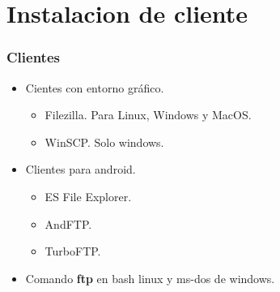 \section{Instalacion de cliente}
  \begin{frame}
    \frametitle{Clientes}
    \begin{itemize}
    	\item Cientes con entorno gr\'afico.
		\begin{itemize}
	   	 \item Filezilla. Para Linux, Windows y MacOS.
	   	 \item WinSCP. Solo windows.
	    \end{itemize}

	    \item Clientes para android.
		\begin{itemize}
	   	 \item ES File Explorer.
	   	 \item AndFTP.
	   	 \item TurboFTP. 
	    \end{itemize}
	   	\item Comando {\bf ftp} en bash linux y ms-dos de windows.
	  \end{itemize}
  \end{frame}